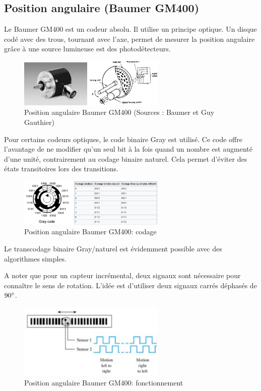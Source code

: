 \subsection{Position angulaire (Baumer GM400)}
Le Baumer GM400 est un codeur absolu. Il utilise un principe optique. Un disque codé avec des trous, tournant avec l'axe, permet de mesurer la position angulaire grâce à une source lumineuse est des photodétecteurs.

\begin{figure}[h!]
\centering
\includegraphics[width=7cm]{assets/figures/4_2_9_Position_angulaire_Baumer_GM400.PNG}
\caption{Position angulaire Baumer GM400 (Sources : Baumer et Guy Gauthier)}
\label{fig:Position_angulaire_Baumer_GM400}
\end{figure}

Pour certains codeurs optiques, le code binaire Gray est utilisé. Ce code offre l'avantage de ne modifier qu'un seul bit à la fois quand un nombre est augmenté d'une unité, contrairement au codage binaire naturel. Cela permet d'éviter des états transitoires lors des transitions.


\begin{figure}[h!]
\centering
\includegraphics[width=7cm]{assets/figures/4_2_9_Position_angulaire_Baumer_GM400_codage.PNG}
\caption{Position angulaire Baumer GM400: codage}
\label{fig:Position_angulaire_Baumer_GM400_codage}
\end{figure}


Le transcodage binaire Gray/naturel est évidemment possible avec des algorithmes simples.

A noter que pour un capteur incrémental, deux signaux sont nécessaire pour connaître le sens de rotation. L'idée est d'utiliser deux signaux carrés déphasés de $90 \degree$.


\begin{figure}[h!]
\centering
\includegraphics[width=7cm]{assets/figures/4_2_9_Position_angulaire_Baumer_GM400_fonctionnement.PNG}
\caption{Position angulaire Baumer GM400: fonctionnement}
\label{fig:Position_angulaire_Baumer_GM400_fonctionnement}
\end{figure}

